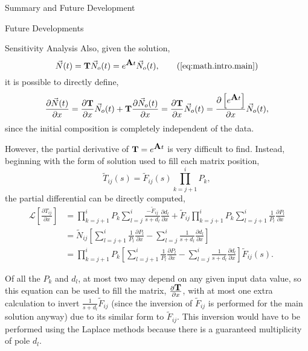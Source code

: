 \begin{chapter}{Summary and Future Development}
\begin{section}{Future Developments}
\begin{subsection}{Sensitivity Analysis}
      Also, given the solution,
      \begin{equation}
        \vec{N}(t) = \mat{T}\vec{N}_o(t) = e^{\mat{A}t}\vec{N}_o(t),\tag{\ref{eq:math.intro.main}}
      \end{equation}
      it is possible to directly define,
      \begin{equation}
        \frac{\partial\vec{N}(t)}{\partial x} =
        \frac{\partial\mbox{$\mathbf{T}$}}{\partial x}\vec{N}_o(t) +
        \mbox{$\mathbf{T}$}\frac{\partial\vec{N}_o(t)}{\partial x} =
        \frac{\partial\mbox{$\mathbf{T}$}}{\partial x}\vec{N}_o(t) = 
        \frac{\partial \left[ e^{\mbox{$\mathbf{A}$}t}\right]}{\partial x}\vec{N}_o(t),
      \end{equation}
      since the initial composition is completely independent of the data.
      
      However, the partial derivative of $\mbox{$\mathbf{T}$} = e^{\mbox{$\mathbf{A}$}t}$ is
      very difficult to find.  Instead, beginning with the form of
      solution used to fill each matrix position,
      \begin{equation}
        \tilde{T}_{ij}(s) = \tilde{F}_{ij}(s) \prod_{k=j+1}^i P_k,
      \end{equation}
      the partial differential can be directly computed,
      \begin{equation}
        \begin{split}
          \mathcal{L}\left[ \frac{\partial T_{ij}}{\partial x} \right ]
          &= \prod_{k=j+1}^i P_k \sum_{l=j}^i
          \frac{-\tilde{F}_{ij}}{s+d_l}\frac{\partial d_l}{\partial x}
          + \tilde{F}_{ij} \prod_{k=j+1}^i P_k \sum_{l=j+1}^i \frac{1}{P_l}\frac{\partial P_l}{\partial x} \\
          &= \tilde{N}_{ij} \left [ \sum_{l=j+1}^i
            \frac{1}{P_l}\frac{\partial P_l}{\partial x}
            - \sum_{l=j}^i \frac{1}{s+d_l}\frac{\partial d_l}{\partial x} \right ] \\
          & = \prod_{k=j+1}^i P_k \left [ \sum_{l=j+1}^i
            \frac{1}{P_l}\frac{\partial P_l}{\partial x} - \sum_{l=j}^i
            \frac{1}{s+d_l}\frac{\partial d_l}{\partial x} \right ]
          \tilde{F}_{ij}(s).
        \end{split}
      \end{equation}
      
      Of all the $P_k$ and $d_l$, at most two may depend on any given
      input data value, so this equation can be used to fill the
      matrix, $\frac{\partial\mbox{$\mathbf{T}$}}{\partial x}$, with at most one
      extra calculation to invert $\frac{1}{s+d_l}\tilde{F}_{ij}$
      (since the inversion of $\tilde{F}_{ij}$ is performed for the
      main solution anyway) due to its similar form to
      $\tilde{F}_{ij}$.  This inversion would have to be performed
      using the Laplace methods because there is a guaranteed
      multiplicity of pole $d_l$.
      

\end{subsection}
\end{section}
\end{chapter}
